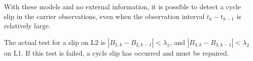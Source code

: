 With these models and no external information, it is possible to detect a cycle slip in the carrier observations, even when the observation interval $t_{k}-t_{k-1}$ is relatively large.

The actual test for a slip on L2 is $|B_{2,k}-B_{2,k-1}|<\lambda_{1}$, and $|B_{3,k}-B_{3,k-1}|<\lambda_{2}$ on L1. If this test is failed, a cycle slip has occurred and must be repaired.